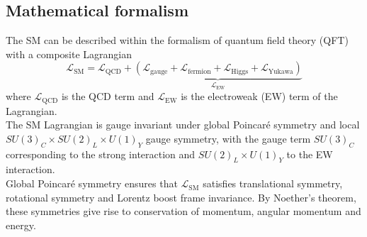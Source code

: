 \documentclass[../thesis.tex]{subfiles}
\begin{document}
\subsection{Mathematical formalism}
The \acs{SM} can be described within the formalism of quantum field theory (\acs{QFT}) with a composite Lagrangian
\begin{equation}
\mathcal{L}_\mathrm{SM} = \mathcal{L}_\mathrm{QCD} + {\underbrace{(\mathcal{L}_\mathrm{gauge}+\mathcal{L}_\mathrm{fermion}+\mathcal{L}_\mathrm{Higgs}+\mathcal{L}_\mathrm{Yukawa})}_{\mathcal{L}_\mathrm{EW}}}
\end{equation}
where $\mathcal{L}_\mathrm{QCD}$ is the \acs{QCD} term and $\mathcal{L}_\mathrm{EW}$ is the electroweak (\acs{EW}) term of the Lagrangian.\\
The \acs{SM} Lagrangian is gauge invariant under global Poincar\'e symmetry and local $SU(3)_C \times SU(2)_L \times U(1)_Y$ gauge symmetry, with the gauge term $SU(3)_C$ corresponding to the strong interaction and $SU(2)_L \times U(1)_Y$ to the \acs{EW} interaction.\\
Global Poincar\'e symmetry ensures that $\mathcal{L}_\mathrm{SM}$ satisfies translational symmetry, rotational symmetry and Lorentz boost frame invariance. By Noether's theorem, these symmetries give rise to conservation of momentum, angular momentum and energy.
\end{document}
